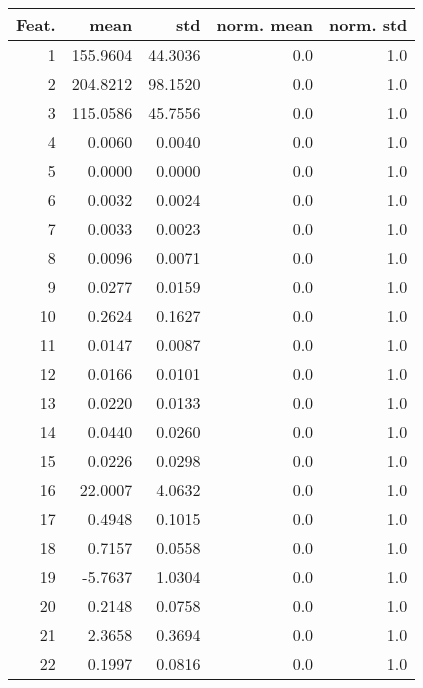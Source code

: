 \begin{tabular}{rrrrr}
\toprule
 Feat. &      mean &      std &  norm. mean &  norm. std \\
\midrule
     1 &  155.9604 &  44.3036 &         0.0 &        1.0 \\
     2 &  204.8212 &  98.1520 &         0.0 &        1.0 \\
     3 &  115.0586 &  45.7556 &         0.0 &        1.0 \\
     4 &    0.0060 &   0.0040 &         0.0 &        1.0 \\
     5 &    0.0000 &   0.0000 &         0.0 &        1.0 \\
     6 &    0.0032 &   0.0024 &         0.0 &        1.0 \\
     7 &    0.0033 &   0.0023 &         0.0 &        1.0 \\
     8 &    0.0096 &   0.0071 &         0.0 &        1.0 \\
     9 &    0.0277 &   0.0159 &         0.0 &        1.0 \\
    10 &    0.2624 &   0.1627 &         0.0 &        1.0 \\
    11 &    0.0147 &   0.0087 &         0.0 &        1.0 \\
    12 &    0.0166 &   0.0101 &         0.0 &        1.0 \\
    13 &    0.0220 &   0.0133 &         0.0 &        1.0 \\
    14 &    0.0440 &   0.0260 &         0.0 &        1.0 \\
    15 &    0.0226 &   0.0298 &         0.0 &        1.0 \\
    16 &   22.0007 &   4.0632 &         0.0 &        1.0 \\
    17 &    0.4948 &   0.1015 &         0.0 &        1.0 \\
    18 &    0.7157 &   0.0558 &         0.0 &        1.0 \\
    19 &   -5.7637 &   1.0304 &         0.0 &        1.0 \\
    20 &    0.2148 &   0.0758 &         0.0 &        1.0 \\
    21 &    2.3658 &   0.3694 &         0.0 &        1.0 \\
    22 &    0.1997 &   0.0816 &         0.0 &        1.0 \\
\bottomrule
\end{tabular}

